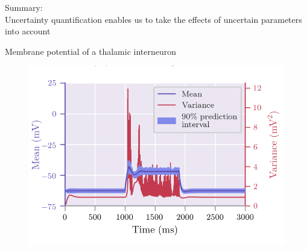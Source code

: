 \documentclass[presentation]{beamer}
\begin{document}
\begin{frame}{{\normalsize Summary:} \\ Uncertainty quantification enables us to take the
  effects of uncertain parameters into account}
  \pause

\end{frame}


\begin{frame}
\end{frame}




\begin{frame}{Membrane potential of a thalamic interneuron}
  \vspace{-5mm}

  \begin{figure}
      \includegraphics[width=1\textwidth]{lgn.png}
  \end{figure}

\end{frame}


\end{document}
